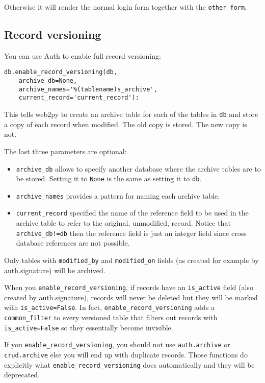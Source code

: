 \documentclass[justified,sixbynine,notoc]{tufte-book}
\def\ft{\small\tt}
\begin{document}
\begin{fullwidth}
Otherwise it will render the normal login form together with the {\ft other\_form}.

\goodbreak\subsection{Record versioning}

You can use Auth to enable full record versioning:

\begin{lstlisting}
db.enable_record_versioning(db,
    archive_db=None,
    archive_names='%(tablename)s_archive',
    current_record='current_record'):
\end{lstlisting}

This tells web2py to create an archive table for each of the tables in {\ft db} and store a copy of each record when modified. The old copy is stored. The new copy is not.

The last three parameters are optional:

\begin{itemize}
\item {\ft archive\_db} allows to specify another database where the archive tables are to be stored. Setting it to {\ft None} is the same as setting it to {\ft db}.

\item {\ft archive\_names} provides a pattern for naming each archive table.

\item {\ft current\_record} specified the name of the reference field to be used in the archive table to refer to the original, unmodified, record. Notice that {\ft archive\_db!=db} then the reference field is just an integer field since cross database references are not possible.
\end{itemize}

Only tables with {\ft modified\_by} and {\ft modified\_on} fields (as created
for example by auth.signature) will be archived.

When you {\ft enable\_record\_versioning}, if records have an
{\ft is\_active} field (also created by auth.signature),
records will never be deleted but they will be marked with {\ft is\_active=False}.
In fact, {\ft enable\_record\_versioning} adds a {\ft common\_filter} to
every versioned table that filters out records with {\ft is\_active=False} so they essentially become invisible.

If you {\ft enable\_record\_versioning}, you should not use
{\ft auth.archive} or {\ft crud.archive} else you will end up with duplicate records.
Those functions do explicitly what {\ft enable\_record\_versioning} does automatically and
they will be deprecated.


\end{fullwidth}
\end{document}
